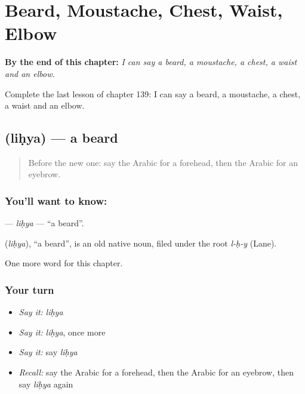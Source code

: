 
\chapter{Beard, Moustache, Chest, Waist, Elbow}
\label{ch:ar-beard-moustache-chest-waist-elbow}

\begin{chapteropening}
\textbf{By the end of this chapter:} \emph{I can say a beard, a moustache, a chest, a waist and an elbow.}

Complete the last lesson of chapter 139: I can say a beard, a moustache, a chest, a waist and an elbow.
\end{chapteropening}

\section[\texorpdfstring{\ar{لحية} (liḥya)}{لحية (liḥya)}]{ (liḥya) — a beard}

\label{lesson:AR-C139-lihya}



\begin{quote}
Before the new one: say the Arabic for a forehead, then the Arabic for an eyebrow.
\end{quote}

\subsection*{You'll want to know: }
\textbf{} — \emph{liḥya} — \textquotedblleft{}a beard\textquotedblright{}.

\begin{cousinweb}
\textbf{} (\emph{liḥya}), \textquotedblleft{}a beard\textquotedblright{}, is an old native noun, filed under the root \emph{l-ḥ-y} (Lane).
\end{cousinweb}

\begin{grammarlens}[title={What you've built}]
One more word for this chapter.
\end{grammarlens}

\subsection*{Your turn}
\begin{itemize}
\raggedright
  \item \emph{Say it:} \emph{liḥya}
  \item \emph{Say it:} \emph{liḥya}, once more
  \item \emph{Say it:} say \emph{liḥya}
  \item \emph{Recall:} say the Arabic for a forehead, then the Arabic for an eyebrow, then say \emph{liḥya} again
\end{itemize}

